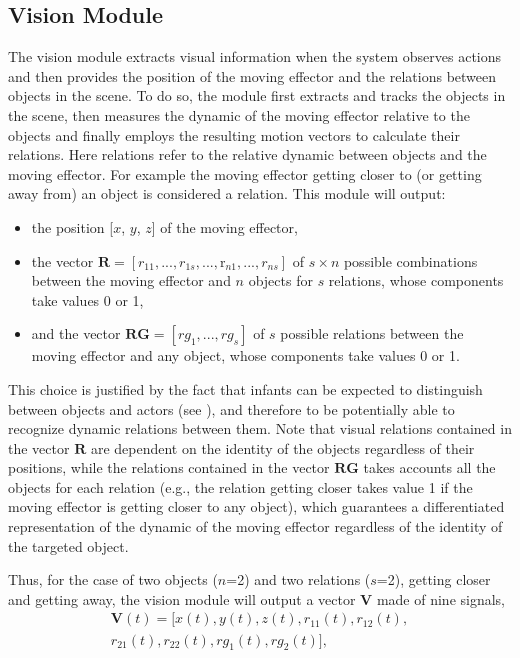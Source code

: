 \documentclass[conference]{IEEEtran}
\begin{document}
\subsection{Vision Module}
The vision module extracts visual information when the system observes actions and then provides the position of the moving effector and the relations between objects in the scene. To do so, the module first extracts and tracks the objects in the scene, then measures the dynamic of the moving effector relative to the objects and finally employs the resulting motion vectors to calculate their relations. Here relations refer to the relative dynamic between objects and the moving effector. For example the moving effector getting closer to (or getting away from) an object is considered a relation. This module will output:
\begin{itemize}
\item the position [$x$, $y$, $z$] of the moving effector,
\item the vector \(\textbf{R}=[\textit{r}_{11},...,\textit{r}_{1s},...,\text{r}_{n1},...,\textit{r}_{ns}]\) of \(s \times n\) possible combinations between the moving effector and $n$ objects for $s$ relations, whose components take values 0 or 1,
\item and the vector \(\textbf{RG}=[\textit{rg}_{1},...,\textit{rg}_{s}]\) of $s$ possible relations between the moving effector and any object, whose components take values 0 or 1.
\end{itemize}

This choice is justified by the fact that infants can be expected to distinguish between objects and actors (see \cite{woodward1998infants}), and therefore to be potentially able to recognize dynamic relations between them. Note that visual relations contained in the vector $\textbf{R}$ are dependent on the identity of the objects regardless of their positions, while the relations contained in the vector $\textbf{RG}$ takes accounts all the objects for each relation (e.g., the relation getting closer takes value 1 if the moving effector is getting closer to any object), which guarantees a differentiated representation of the dynamic of the moving effector regardless of the identity of the targeted object.

Thus, for the case of two objects ($n$=2) and two relations ($s$=2), getting closer and getting away, the vision module will output a vector \(\textbf{V}\) made of nine signals,
\begin{equation}
\begin{split}
	\textbf{V}(t)=[\textit{x}(t), \textit{y}(t), \textit{z}(t), \textit{r}_{11}(t), \textit{r}_{12}(t),\\ \textit{r}_{21}(t), \textit{r}_{22}(t), \textit{rg}_{1}(t), \textit{rg}_{2}(t)],
\end{split}
\end{equation}
\end{document}
